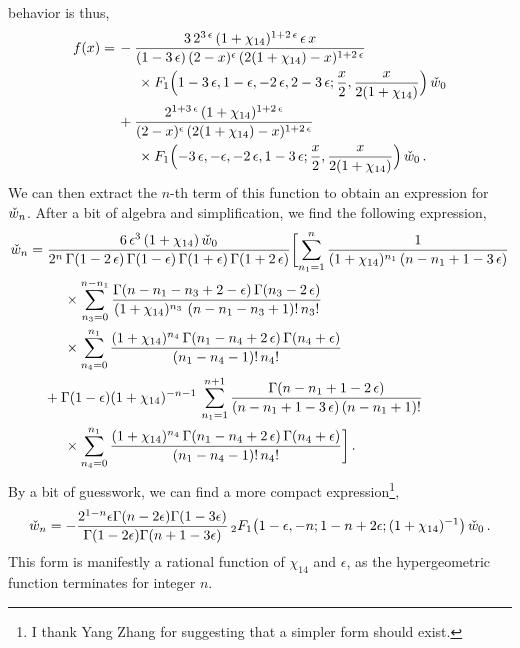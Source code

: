 \documentclass[aps,prd,preprint,groupedaddress,nofootinbib,showpacs,eqsecnum]{revtex4}
\def\eps{\epsilon}
\begin{document}
behavior is thus,
\begin{equation}
\begin{aligned}
f(x) =\,&
-\frac{3 \,2^{3\,\eps}\,(1+\chi_{14})^{1+2\,\eps}\,\eps\,x}
{(1-3\,\eps)\,(2-x)^{\eps}\,(2(1+\chi_{14})-x)^{1+2\,\eps}}
\\&\indentP
F_1\Bigl(1-3\,\eps,1-\eps,-2\,\eps,2-3\,\eps;
\frac{x}{2},\frac{x}{2(1+\chi_{14})}\Bigr)
\,\ws_0
\\&
+\frac{2^{1+3\,\eps}\,(1+\chi_{14})^{1+2\,\eps}}
{(2-x)^{\eps}\,(2(1+\chi_{14})-x)^{1+2\,\eps}}
\\&\indentP
F_1\Bigl(-3\,\eps,-\eps,-2\,\eps,1-3\,\eps;
\frac{x}{2},\frac{x}{2(1+\chi_{14})}\Bigr)\,\ws_0
\,.
\end{aligned}
\end{equation}
\def\indentB{\hspace*{5mm}}
\def\indentC{\hspace*{18mm}}
\def\indentN{}
We can then extract the $n$-th term of this function to obtain an
expression for $\check{w}_n$.  After a bit of algebra and simplification, we
find the following expression,
\begin{equation}
\begin{aligned}
\ws_n &=
\frac{6\,\eps^{3}\,(1+\chi_{14})\,\ws_0}
{2^{n}\,\Gamma(1-2\,\eps)\,\Gamma(1-\eps)\,\Gamma(1+\eps)\,\Gamma(1+2\,\eps)}
\biggl[
\sum_{n_1=1}^{n}\frac{1}
{(1+\chi_{14})^{n_1}\,(n-n_1+1-3\,\eps)}
\\&\hphantom{=\,\,}\indentB\times
\sum_{n_3=0}^{n-n_1}\frac{\Gamma(n-n_1-n_3+2-\eps)\,\Gamma(n_3-2\,\eps)}
{(1+\chi_{14})^{n_3}\,\left(n-n_1-n_3+1\right)!\,n_3!}
\\&\hphantom{=\,\,}\indentB\times 
\sum_{n_4=0}^{n_1}
\frac{(1+\chi_{14})^{n_4}\,\Gamma(n_1-n_4+2\,\eps)\,\Gamma(n_4+\eps)}
{(n_1-n_4-1)!\,n_4!}
\\&\hphantom{=\,\,}
+\Gamma(1-\eps)(1+\chi_{14})^{-n-1}\,
\sum_{n_1=1}^{n+1}\frac{\Gamma(n-n_1+1-2\,\eps)}
{(n-n_1+1-3\,\eps)\,(n-n_1+1)!}
\\&\hphantom{=\,\,}\indentB\times
\sum_{n_4=0}^{n_1}
\frac{(1+\chi_{14})^{n_4}\,\Gamma(n_1-n_4+2\,\eps)\,\Gamma(n_4+\eps)}
{(n_1-n_4-1)!\,n_4!}
\indentN %
\biggr]
\,.
\end{aligned}
\label{SlashedBoxGeneralTerm}
\end{equation}
By a bit of guesswork, we can find a more compact 
expression\footnote{I thank Yang Zhang for suggesting that a 
	simpler form should exist.},
\begin{equation}
\ws_n = 
-\frac{2^{1-n} \eps \Gamma(n-2\eps)\Gamma(1-3\eps)}
{\Gamma(1-2\eps)\Gamma(n+1-3\eps)}\,
\F21\bigl(1-\eps,-n;1-n+2\eps;(1+\chi_{14})^{-1}\bigr)\,\ws_0
\,.
\label{SlashedBoxGeneralTermSimplified}
\end{equation}
This form is manifestly a rational function of $\chi_{14}$ and $\eps$,
as the hypergeometric function terminates for integer $n$.
\end{document}
